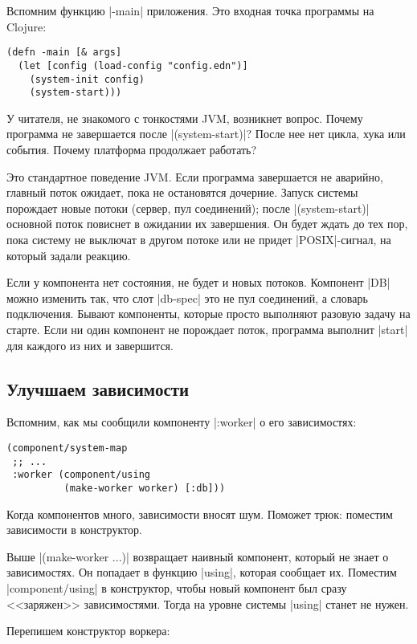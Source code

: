 Вспомним функцию \spverb|-main| приложения. Это входная точка программы на
Clojure:

\begin{verbatim}
(defn -main [& args]
  (let [config (load-config "config.edn")]
    (system-init config)
    (system-start)))
\end{verbatim}

У читателя, не знакомого с тонкостями JVM, возникнет вопрос. Почему программа не
завершается после \spverb|(system-start)|? После нее нет цикла, хука или
события. Почему платформа продолжает работать?

Это стандартное поведение JVM. Если программа завершается не аварийно, главный
поток ожидает, пока не остановятся дочерние. Запуск системы порождает новые
потоки (сервер, пул соединений); после \spverb|(system-start)| основной поток
повиснет в ожидании их завершения. Он будет ждать до тех пор, пока систему не
выключат в другом потоке или не придет \spverb|POSIX|-сигнал, на который задали
реакцию.

Если у компонента нет состояния, не будет и новых потоков. Компонент \spverb|DB|
можно изменить так, что слот \spverb|db-spec| это не пул соединений, а словарь
подключения. Бывают компоненты, которые просто выполняют разовую задачу на
старте. Если ни один компонент не порождает поток, программа выполнит
\spverb|start| для каждого из них и завершится.

\subsection{Улучшаем зависимости}

Вспомним, как мы сообщили компоненту \spverb|:worker| о его зависимостях:

\begin{verbatim}
(component/system-map
 ;; ...
 :worker (component/using
          (make-worker worker) [:db]))
\end{verbatim}

Когда компонентов много, зависимости вносят шум. Поможет трюк: поместим
зависимости в конструктор.

Выше \spverb|(make-worker {...})| возвращает наивный компонент, который не знает
о зависимостях. Он попадает в функцию \spverb|using|, которая сообщает
их. Поместим \spverb|component/using| в конструктор, чтобы новый компонент был
сразу <<заряжен>> зависимостями. Тогда на уровне системы \spverb|using| станет
не нужен.

Перепишем конструктор воркера:

